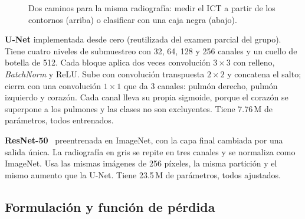 \documentclass[conference]{IEEEtran}
\begin{document}
\begin{figure}[t]
\centering
{}
\caption{Dos caminos para la misma radiografía: medir el ICT a partir de los contornos (arriba) o clasificar con una
caja negra (abajo).}\label{fig:pipeline}
\end{figure}

\textbf{U-Net} implementada desde cero (reutilizada del examen parcial del grupo). Tiene cuatro niveles de
submuestreo con 32, 64, 128 y 256 canales y un cuello de botella de 512. Cada bloque aplica dos veces convolución
$3\times3$ con relleno, \emph{BatchNorm} y ReLU. Sube con convolución transpuesta $2\times2$ y concatena el salto; cierra
con una convolución $1\times1$ que da 3 canales: pulmón derecho, pulmón izquierdo y corazón. Cada canal lleva su propia
sigmoide, porque el corazón se superpone a los pulmones y las clases no son excluyentes. Tiene 7.76\,M de parámetros,
todos entrenados.

\textbf{ResNet-50}~\cite{he2016resnet} preentrenada en ImageNet, con la capa final cambiada por una salida única. La
radiografía en gris se repite en tres canales y se normaliza como ImageNet. Usa las mismas imágenes de 256 píxeles, la
misma partición y el mismo aumento que la U-Net. Tiene 23.5\,M de parámetros, todos ajustados.

\subsection{Formulación y función de pérdida}
\end{document}
